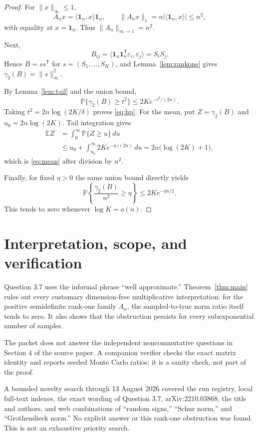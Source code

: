 \documentclass[11pt]{article}
\newcommand{\E}{\mathbb E}
\newcommand{\PP}{\mathbb P}
\newcommand{\one}{\mathbf 1}
\newcommand{\gamtwo}{\gamma_2}
\begin{document}
\begin{proof}
For $\|x\|_\infty\leq1$,
\[
 A_nx=\langle\one_n,x\rangle\one_n,
 \qquad
 \|A_nx\|_1=n|\langle\one_n,x\rangle|\leq n^2,
\]
with equality at $x=\one_n$.  Thus $\|A_n\|_{\infty\to1}=n^2$.

Next,
\[
 B_{ij}
 =\langle \one_n\one_n^{\mathsf T}\varepsilon_i,
          \varepsilon_j\rangle
 =S_iS_j.
\]
Hence $B=ss^{\mathsf T}$ for $s=(S_1,\ldots,S_K)$, and
Lemma~\ref{lem:rankone} gives $\gamtwo(B)=\|s\|_\infty^2$.

By Lemma~\ref{lem:tail} and the union bound,
\[
 \PP\{\gamtwo(B)\geq t^2\}
 \leq 2K e^{-t^2/(2n)}.
\]
Taking $t^2=2n\log(2K/\delta)$ proves \eqref{eq:hp}.  For the mean, put
$Z=\gamtwo(B)$ and $u_0=2n\log(2K)$.  Tail integration gives
\begin{align*}
 \E Z
 &=\int_0^\infty\PP\{Z\geq u\}\,du\\
 &\leq u_0+\int_{u_0}^\infty2K e^{-u/(2n)}\,du
 =2n\bigl(\log(2K)+1\bigr),
\end{align*}
which is \eqref{eq:mean} after division by $n^2$.

Finally, for fixed $\eta>0$ the same union bound directly yields
\[
 \PP\left\{\frac{\gamtwo(B)}{n^2}\geq\eta\right\}
 \leq2K e^{-\eta n/2}.
\]
This tends to zero whenever $\log K=o(n)$.
\end{proof}

\section{Interpretation, scope, and verification}

Question 3.7 uses the informal phrase ``well approximate.''
Theorem~\ref{thm:main} rules out every customary dimension-free
multiplicative interpretation: for the positive semidefinite rank-one family
$A_n$, the sampled-to-true norm ratio itself tends to zero.  It also shows
that the obstruction persists for every subexponential number of samples.

The packet does not answer the independent noncommutative questions in
Section 4 of the source paper.  A companion verifier checks the exact matrix
identity and reports seeded Monte Carlo ratios; it is a sanity check, not part
of the proof.

A bounded novelty search through 13 August 2026 covered the run registry,
local full-text indexes, the exact wording of Question 3.7, arXiv:2210.03868,
the title and authors, and web combinations of ``random signs,'' ``Schur
norm,'' and ``Grothendieck norm.''  No explicit answer or this rank-one
obstruction was found.  This is not an exhaustive priority search.
\end{document}
